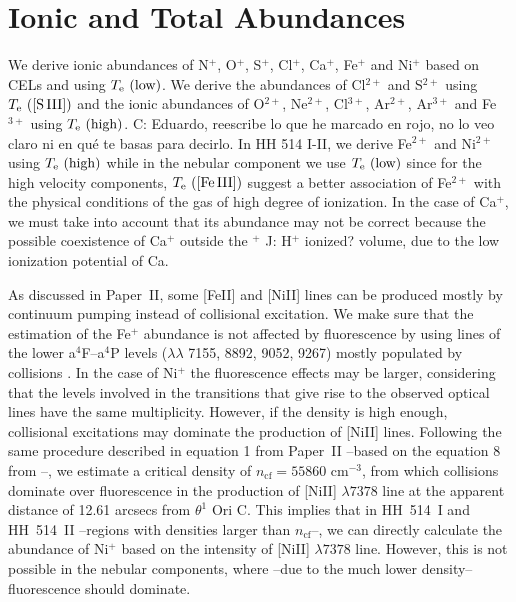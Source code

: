 \documentclass[fleqn,usenatbib]{mnras}
\newcommand{\jorge}[1]{{\color{magenta}J: #1}}
\newcommand{\cesar}[1]{{\color{red}C: #1}}
\begin{document}
\section{Ionic and Total Abundances}
\label{sec:ionic_total_abundances}

We derive ionic abundances of N$^{+}$, O$^{+}$, S$^{+}$, Cl$^{+}$, Ca$^{+}$, Fe$^{+}$ and Ni$^{+}$ based on CELs and using $T_{\rm e} \text{ (low)}$. We derive the abundances of Cl$^{2+}$ and S$^{2+}$ using $T_{\rm e} \text{ ([S\thinspace III])}$ and the ionic abundances of O$^{2+}$, Ne$^{2+}$, Cl$^{3+}$, Ar$^{2+}$, Ar$^{3+}$ and Fe$^{3+}$ using $T_{\rm e} \text{ (high)}$. \cesar{Eduardo, reescribe lo que he marcado en rojo, no lo veo claro ni en qué te basas para decirlo. In HH 514 I-II, we derive Fe$^{2+}$ and Ni$^{2+}$ using $T_{\rm e} \text{ (high)}$ while in the nebular component we use $T_{\rm e} \text{ (low)}$ since for the high velocity components, $T_{\rm e} \text{ ([Fe\thinspace III])}$ suggest a better association of Fe$^{2+}$ with the physical conditions of the gas of high degree of ionization}. In the case of Ca$^+$, we must take into account that its abundance may not be correct because the possible coexistence of Ca$^+$ outside the $^+$ \jorge{H$^+$ ionized?} volume, due to the low ionization potential of Ca. 

As discussed in Paper~II, some [Fe\thinspace II] and [Ni\thinspace II] lines can be produced mostly by continuum pumping instead of collisional excitation. We make sure that the estimation of the Fe$^+$ abundance is not affected by fluorescence by using lines of the lower  a$^4$F--a$^4$P levels  ($\lambda \lambda$ 7155, 8892, 9052, 9267) mostly populated by collisions \citep{Baldwin96}. In the case of Ni$^+$ the fluorescence effects may be larger, considering that the  levels involved in the transitions that give rise to the observed optical lines have the same multiplicity. However, if the density is high enough, collisional excitations may dominate the production of [Ni\thinspace II] lines. Following the same procedure described in equation 1 from Paper~II --based on the equation 8 from \citet{Bautista96}--, we estimate a critical density of $n_{\text{cf}}= 55860 \text{ cm}^{-3}$, from which collisions dominate over  fluorescence in the production of [Ni\thinspace II] $\lambda 7378$ line at the apparent distance of 12.61 arcsecs from $\theta^1$ Ori C. This implies that in HH~514~I and HH~514~II --regions with densities larger than $n_{\text{cf}}$--, we can directly calculate the abundance of Ni$^{+}$ based on the intensity of [Ni\thinspace II] $\lambda 7378$ line. However, this is not possible in the nebular components, where --due to the much lower density-- fluorescence should dominate.
\end{document}
